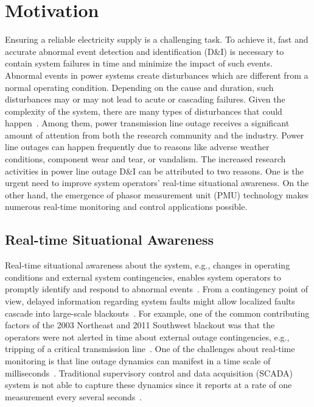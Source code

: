 \section{Motivation}

Ensuring a reliable electricity supply is a challenging task. To achieve it, fast and accurate abnormal event detection and identification (D\&I) is necessary to contain system failures in time and minimize the impact of such events. Abnormal events in power systems create disturbances which are different from a normal operating condition. Depending on the cause and duration, such disturbances may or may not lead to acute or cascading failures. Given the complexity of the system, there are many types of disturbances that could happen~\cite{seymour2005seven}. Among them, power transmission line outage receives a significant amount of attention from both the research community and the industry. Power line outages can happen frequently due to reasons like adverse weather conditions, component wear and tear, or vandalism. The increased research activities in power line outage D\&I can be attributed to two reasons. One is the urgent need to improve system operators' real-time situational awareness. On the other hand, the emergence of phasor measurement unit (PMU) technology makes numerous real-time monitoring and control applications possible. 

\subsection{Real-time Situational Awareness}

Real-time situational awareness about the system, e.g., changes in operating conditions and external system contingencies, enables system operators to promptly identify and respond to abnormal events~\cite{kezunovic2013role}. From a contingency point of view, delayed information regarding system faults might allow localized faults cascade into large-scale blackouts~\cite{Aminifar2014}. For example, one of the common contributing factors of the 2003 Northeast and 2011 Southwest blackout was that the operators were not alerted in time about external outage contingencies, e.g., tripping of a critical transmission line~\cite{Johnson2000}. One of the challenges about real-time monitoring is that line outage dynamics can manifest in a time scale of milliseconds~\cite{Milano2010power}. Traditional supervisory control and data acquisition (SCADA) system is not able to capture these dynamics since it reports at a rate of one measurement every several seconds~\cite{pignati2015real}.


